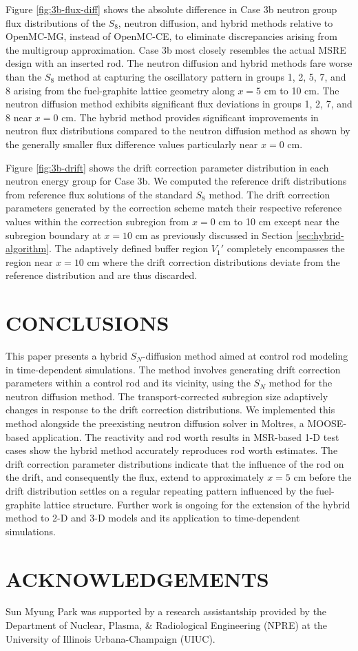 \documentclass[letterpaper]{mc2025}
\begin{document}
Figure \ref{fig:3b-flux-diff} shows the absolute
difference in Case 3b neutron group flux distributions of the $S_8$, neutron diffusion, and
hybrid methods relative to OpenMC-MG, instead of OpenMC-CE, to eliminate discrepancies arising from
the multigroup approximation. Case 3b most closely resembles the actual \gls*{MSRE} design with an
inserted rod.
The neutron diffusion and hybrid methods fare worse than the $S_8$ method at capturing the
oscillatory pattern in groups 1, 2, 5, 7, and 8 arising from the fuel-graphite lattice geometry
along $x=5$ cm to 10 cm. The neutron diffusion method
exhibits significant flux deviations in groups 1, 2, 7, and 8 near $x=0$ cm. The hybrid method
provides significant improvements in neutron flux distributions compared to the neutron diffusion
method as shown by the generally smaller flux difference values particularly near $x=0$ cm.

Figure \ref{fig:3b-drift} shows the drift correction parameter distribution in each neutron energy
group for Case 3b. We computed the reference drift distributions from reference flux
solutions of the standard $S_8$ method.
The drift correction parameters generated by the correction scheme match their respective reference
values within the correction subregion from $x=0$ cm to 10 cm except near the subregion boundary at
$x=10$ cm as previously discussed in Section \ref{sec:hybrid-algorithm}. The adaptively defined
buffer region $V_1'$ completely encompasses the region near $x=10$ cm where the drift correction
distributions deviate from the reference distribution and are thus discarded.

\section{CONCLUSIONS}

This paper presents a hybrid $S_N$-diffusion method aimed at control rod modeling in time-dependent
simulations. The method involves generating drift correction parameters within a control rod and
its vicinity, using the $S_N$ method for the neutron diffusion method. The transport-corrected
subregion size adaptively changes in response to the drift correction distributions. We implemented
this method alongside the preexisting neutron diffusion solver in Moltres, a \gls*{MOOSE}-based
application. The reactivity and rod worth results in \gls*{MSR}-based 1-D test cases show the hybrid
method accurately reproduces rod worth estimates. The drift correction parameter
distributions indicate that the influence of the rod on the drift, and
consequently the flux, extend to approximately $x=5$ cm before the drift distribution settles on a
regular repeating pattern influenced by the fuel-graphite lattice structure. Further work is
ongoing for the extension of the hybrid method to 2-D and 3-D models and its application to
time-dependent simulations.

\section*{ACKNOWLEDGEMENTS}
Sun Myung Park was supported by a research assistantship provided by the Department of Nuclear,
Plasma, \& Radiological Engineering (NPRE) at the University of Illinois Urbana-Champaign (UIUC).



\end{document}
